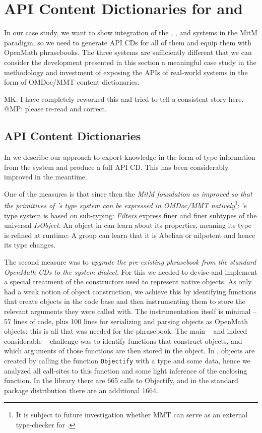 \section{API Content Dictionaries for \GAP and \Sage}\label{sec:apit}
In our case study, we want to show integration of the \GAP, \Singular, and \Sage systems
in the MitM paradigm, so we need to generate API CDs for all of them and equip them with
OpenMath phrasebooks. The three systems are sufficiently different that we can consider
the development presented in this section a meaningful case study in the methodology and
investment of exposing the APIs of real-world systems in the form of OMDoc/MMT content
dictionaries.

\begin{newpart}{MK: I have completely reworked this and tried to tell a consistent story
    here. @MP: please re-read and correct.}
\subsection{\GAP API Content Dictionaries}

In \cite{DehKohKon:iop16} we describe our approach to export knowledge in the form of type
information from the \GAP system and produce a full \GAP API CD. This has been
considerably improved in the meantime. 

One of the measures is that since then the \emph{MitM foundation as improved so that the primitives of \GAP's type system can be
  expressed in OMDoc/MMT natively}\footnote{It is subject to future investigation whether
  MMT can serve as an external type-checker for \GAP.}: \GAP's type system is based on
sub-typing: \emph{Filters} express finer and finer subtypes of the universal
\emph{IsObject}. An object in \GAP can learn about its properties, meaning its type is
refined at runtime: A group can learn that it is Abelian or nilpotent and hence its type
changes.

The second measure was to \emph{upgrade the pre-existing \GAP phrasebook from the standard
  OpenMath CDs to the \GAP system dialect}. For this we needed to devise and implement a
special treatment of the \GAP constructors used to represent native \GAP objects. As \GAP
only had a weak notion of object construction, we achieve this by identifying functions
that create objects in the \GAP code base and then instrumenting them to store the
relevant arguments they were called with.  The instrumentation itself is minimal -- 57
lines of \GAP code, plus 100 lines for serializing and parsing \GAP objects as OpenMath
objects: this is all that was needed for the phrasebook.  The main -- and indeed
considerable -- challenge was to identify functions that construct objects, and which
arguments of those functions are then stored in the object.  In \GAP, objects are created
by calling the function \lstinline|Objectify| with a type and some data, hence we analyzed
all call-sites to this function and some light inference of the enclosing function. In the
\GAP library there are 665 calls to Objectify, and in the standard package distribution
there are an additional 1664.


\end{newpart}
